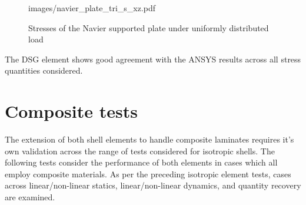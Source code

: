 \begin{figure}[h!]
{		{images/navier_plate_tri_s_xz.pdf}}
	\\
	\caption{\label{Navier_tri_s_xx_yy}Stresses of the Navier supported plate under uniformly distributed load}
\end{figure}

The DSG element shows good agreement with the ANSYS results across all stress quantities considered.

\section{Composite tests}

The extension of both shell elements to handle composite laminates requires it's own validation across the range of tests considered for isotropic shells. The following tests consider the performance of both elements in cases which all employ composite materials. As per the preceding isotropic element tests, cases across linear/non-linear statics, linear/non-linear dynamics, and quantity recovery are examined.

